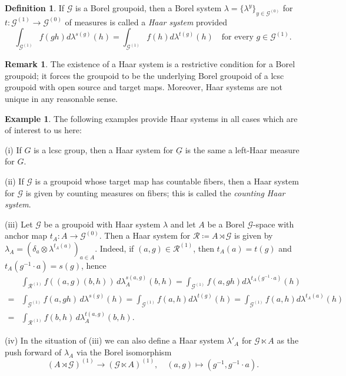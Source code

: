 \documentclass[11pt, oneside]{amsart}
\theoremstyle{definition}
\newtheorem{defn}[lemma]{Definition}
\newtheorem{example}[lemma]{Example}
\newtheorem{remark}[lemma]{Remark}
\theoremstyle{remark}
\theoremstyle{TheoremNum}
\newcommand{\cG}{\mathcal{G}}
\newcommand{\cR}{\mathcal{R}}
\begin{document}
\begin{defn} If $\mathcal{G}$ is a Borel groupoid, then a Borel system $\lambda = \{\lambda^y\}_{y\in \mathcal{G}^{(0)}}$ for $t:\mathcal{G}^{(1)}\to \mathcal{G}^{(0)}$ of measures is called a \emph{Haar system} provided
\[
  \int_{\mathcal{G}^{(1)}}f(gh) d\lambda^{s(g)}(h)=\int_{\mathcal{G}^{(1)}}f(h)d\lambda^{t(g)}(h) \quad \text{for every }g \in \cG^{(1)}.
\]
\end{defn}
\begin{remark} The existence of a Haar system is a restrictive condition for a Borel groupoid; it forces the groupoid to be the underlying Borel groupoid of a lcsc groupoid with open source and target maps. Moreover, Haar systems are not unique in any reasonable sense. 
\end{remark}
\begin{example} The following examples provide Haar systems in all cases which are of interest to us here:
\item (i) If $G$ is a lcsc group, then a Haar system for $\underline{G}$ is the same a left-Haar measure for $G$.
\item (ii) If $\cG$ is a groupoid whose target map has countable fibers, then a Haar system for $\cG$ is given by counting measures on fibers; this is called the \emph{counting Haar system}.
\item (iii) Let $\cG$ be a groupoid with Haar system $\lambda$ and let $A$ be a Borel $\cG$-space with anchor map $t_A: A \to \cG^{(0)}$. Then a Haar system for $\cR \coloneqq A \rtimes \cG$ is given by $\lambda_A = (\delta_a \otimes \lambda^{t_A(a)})_{a \in A}$. Indeed, if $(a,g) \in \cR^{(1)}$, then $t_A(a) = t(g)$ and $t_A(g^{-1} \cdot a) = s(g)$, hence
\begin{align*}
&\int_{\cR^{(1)}} f((a,g)(b,h)) \, d\lambda_A^{s(a,g)}(b,h)  = \int_{\cG^{(1)}} f(a, gh) d\lambda^{t_A(g^{-1} \cdot a)}(h) \\
=& \int_{\cG^{(1)}} f(a, gh)\, d\lambda^{s(g)}(h)
 =  \int_{\cG^{(1)}} f(a,h)  d\lambda^{t(g)}(h) 
 =  \int_{\cG^{(1)}} f(a,h)  d\lambda^{t_A(a)}(h)\\
  =& \int_{\cR^{(1)}} f(b,h) \, d\lambda_A^{t(a,g)}(b,h).
\end{align*}
\item (iv) In the situation of (iii) we can also define a Haar system $\lambda'_A$ for $\cG \ltimes A$ as the push forward of $\lambda_A$ via the Borel isomorphism 
\[
(A \rtimes \cG)^{(1)} \to (\cG \ltimes A)^{(1)}, \quad (a,g) \mapsto (g^{-1}, g^{-1}\cdot a).
\]
\end{example}
\end{document}
